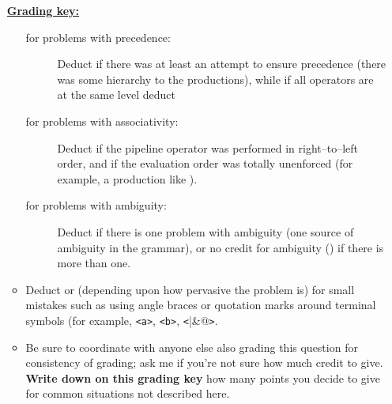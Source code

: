 \documentclass[11pt,fleqn]{article}
\begin{document}
\begin{enumerate}
\begin{info}{\textbf{\underline{Grading key:}}}
\begin{itemize}
\begin{description}
                      \item[for problems with precedence:] Deduct  if
                            there was at least an attempt to ensure precedence
                            (there was some hierarchy to the productions),
                            while if all operators are at the same level
                            deduct 

                      \item[for problems with associativity:] Deduct 
                            if the pipeline operator was performed in
                            right--to--left order, and  if the
                            evaluation order was totally unenforced (for
                            example, a production like
                            ).

                      \item[for problems with ambiguity:] Deduct  if
                            there is one problem with ambiguity (one source of
                            ambiguity in the grammar), or no credit for
                            ambiguity () if there is more than one.

                    \end{description}

                    \vspace{-0mm}

              \item Deduct  or  (depending upon how pervasive
                    the problem is) for small mistakes such as using angle
                    braces or quotation marks around terminal symbols (for
                    example, \texttt{<a>}, \texttt{<b>},
                    \texttt{<}\verb@|&@\texttt{>}.

              \item Be sure to coordinate with anyone else also grading this
                    question for consistency of grading; ask me if you're
                    not sure how much credit to give.  \textbf{Write down on
                    this grading key} how many points you decide to give
                    for common situations not described here.

            \end{itemize}

            \vspace{-2.5mm}


\end{info}
\end{enumerate}
\end{document}
